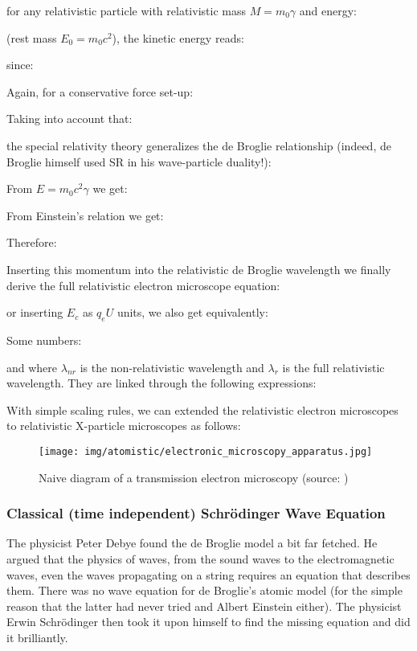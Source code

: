 	for any relativistic particle with relativistic mass $M=m_0\gamma$ and energy:
	
	(rest mass $E_0=m_0c^2$), the kinetic energy reads:
	
	since:
	
	Again, for a conservative force set-up:
	
	Taking into account that:
	
	the special relativity theory generalizes the de Broglie relationship (indeed, de Broglie himself used SR in his wave-particle duality!):
	
	From $E=m_0c^2\gamma$ we get:
	
	From Einstein's relation we get:
	
	Therefore:
	
	Inserting this momentum into the relativistic de Broglie wavelength we finally derive the full relativistic electron microscope equation:
	
	or inserting $E_c$ as $q_eU$ units, we also get equivalently:
	
	Some numbers:
	
	and where $\lambda_{nr}$ is the non-relativistic wavelength and $\lambda_r$ is the full relativistic wavelength. They are linked through the following expressions:
	
	With simple scaling rules, we can extended the relativistic electron microscopes to relativistic X-particle microscopes as follows:
	
	\begin{figure}[H]
		\centering
		\texttt{[image: img/atomistic/electronic\_microscopy\_apparatus.jpg]}
		\caption[Naive diagram of a transmission electron microscopy]{Naive diagram of a transmission electron microscopy (source: \cite{serway2018physics})}
	\end{figure}

	\pagebreak
	\subsubsection{Classical (time independent) Schrödinger Wave Equation}\label{schrodinger wave equation}
	The physicist Peter Debye found the de Broglie model a bit far fetched. He argued that the physics of waves, from the sound waves to the electromagnetic waves, even the waves propagating on a string requires an equation that describes them. There was no wave equation for de Broglie's atomic model (for the simple reason that the latter had never tried and Albert Einstein either). The physicist Erwin Schrödinger then took it upon himself to find the missing equation and did it brilliantly.

